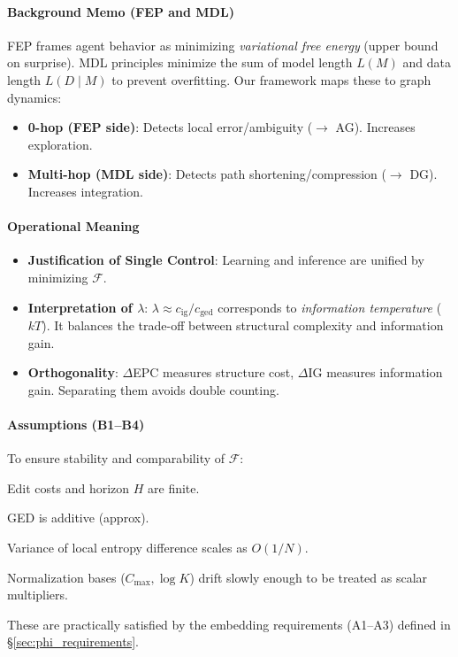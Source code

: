 \documentclass[12pt]{article}
\newcommand{\F}{\mathcal{F}}
\begin{document}
\paragraph{Background Memo (FEP and MDL)}\;
FEP frames agent behavior as minimizing \emph{variational free energy} (upper bound on surprise). MDL principles minimize the sum of model length $L(M)$ and data length $L(D\mid M)$ to prevent overfitting. Our framework maps these to graph dynamics:
\begin{itemize}
    \item \textbf{0-hop (FEP side)}: Detects local error/ambiguity ($\to$ AG). Increases exploration.
    \item \textbf{Multi-hop (MDL side)}: Detects path shortening/compression ($\to$ DG). Increases integration.
\end{itemize}

\paragraph{Operational Meaning}
\begin{itemize}[leftmargin=*]
    \item \textbf{Justification of Single Control}: Learning and inference are unified by minimizing $\F$.
    \item \textbf{Interpretation of $\lambda$}: $\lambda \approx c_{\mathrm{ig}}/c_{\mathrm{ged}}$ corresponds to \emph{information temperature} ($kT$). It balances the trade-off between structural complexity and information gain.
    \item \textbf{Orthogonality}: $\Delta$EPC measures structure cost, $\Delta$IG measures information gain. Separating them avoids double counting.
\end{itemize}

\paragraph{Assumptions (B1--B4)}\;
To ensure stability and comparability of $\F$:
\begin{description}[leftmargin=1.8em]
    \item[(B1) Local Boundedness] Edit costs and horizon $H$ are finite.
    \item[(B2) Edit Decomposition] GED is additive (approx).
    \item[(B3) Entropy Estimation] Variance of local entropy difference scales as $O(1/N)$.
    \item[(B4) Normalization Stability] Normalization bases ($C_{\max}, \log K$) drift slowly enough to be treated as scalar multipliers.
\end{description}
These are practically satisfied by the embedding requirements (A1--A3) defined in \S\ref{sec:phi_requirements}.
\end{document}
